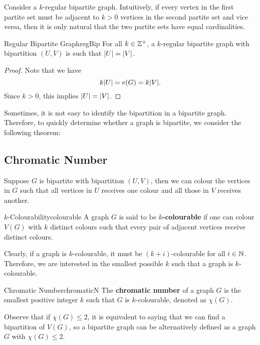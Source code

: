 \documentclass[math, code]{amznotes}
\theoremstyle{remark}
\begin{document}
Consider a $k$-regular bipartite graph. Intuitively, if every vertex in the first partite set must be adjacent to $k > 0$ vertices in the second partite set and vice versa, then it is only natural that the two partite sets have equal cardinalities.
\begin{probox}{Regular Bipartite Graph}{regBip}
    For all $k \in \mathbb{Z}^+$, a $k$-regular bipartite graph with bipartition $(U, V)$ is such that ${\left\lvert {U} \right\rvert} = {\left\lvert {V} \right\rvert}$.
    \tcblower
    \begin{proof}
        Note that we have
        \begin{equation*}
            k{\left\lvert {U} \right\rvert} = e(G) = k{\left\lvert {V} \right\rvert}.
        \end{equation*}
        Since $k > 0$, this implies ${\left\lvert {U} \right\rvert} = {\left\lvert {V} \right\rvert}$.
    \end{proof}
\end{probox}
Sometimes, it is not easy to identify the bipartition in a bipartite graph. Therefore, to quickly determine whether a graph is bipartite, we consider the following theorem:
\subsection{Chromatic Number}
Suppose $G$ is bipartite with bipartition $(U, V)$, then we can colour the vertices in $G$ such that all vertices in $U$ receives one colour and all those in $V$ receives another.
\begin{dfnbox}{$k$-Colourability}{colourable}
    A graph $G$ is said to be {\color{red} \textbf{$k$-colourable}} if one can colour $V(G)$ with $k$ distinct colours such that every pair of adjacent vertices receive distinct colours.
\end{dfnbox}
Clearly, if a graph is $k$-colourable, it must be $(k + i)$-colourable for all $i \in \mathbb{N}$. Therefore, we are interested in the smallest possible $k$ such that a graph is $k$-colourable.
\begin{dfnbox}{Chromatic Number}{chromaticN}
    The {\color{red} \textbf{chromatic number}} of a graph $G$ is the smallest positive integer $k$ such that $G$ is $k$-colourable, denoted as $\chi(G)$.
\end{dfnbox}
Observe that if $\chi(G) \leq 2$, it is equivalent to saying that we can find a bipartition of $V(G)$, so a bipartite graph can be alternatively defined as a graph $G$ with $\chi(G) \leq 2$. 
\end{document}
